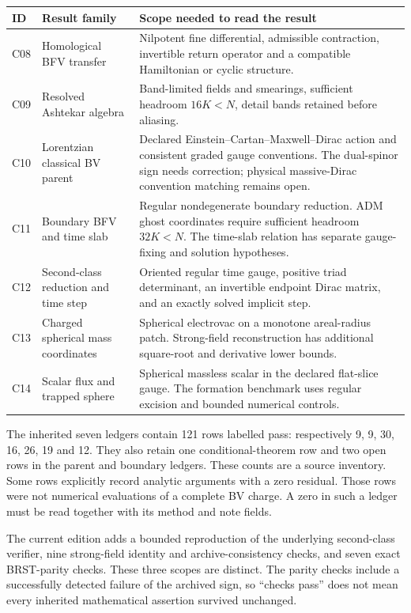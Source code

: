 \begin{longtable}{@{}L{.07\textwidth}L{.38\textwidth}L{.45\textwidth}@{}}
\toprule
ID & Result family & Scope needed to read the result\\
\midrule
\endhead
C08 & Homological BFV transfer & Nilpotent fine differential, admissible contraction, invertible return operator and a compatible Hamiltonian or cyclic structure.\\
C09 & Resolved Ashtekar algebra & Band-limited fields and smearings, sufficient headroom \(16K<N\), detail bands retained before aliasing.\\
C10 & Lorentzian classical BV parent & Declared Einstein--Cartan--Maxwell--Dirac action and consistent graded gauge conventions. The dual-spinor sign needs correction; physical massive-Dirac convention matching remains open.\\
C11 & Boundary BFV and time slab & Regular nondegenerate boundary reduction. ADM ghost coordinates require sufficient headroom \(32K<N\). The time-slab relation has separate gauge-fixing and solution hypotheses.\\
C12 & Second-class reduction and time step & Oriented regular time gauge, positive triad determinant, an invertible endpoint Dirac matrix, and an exactly solved implicit step.\\
C13 & Charged spherical mass coordinates & Spherical electrovac on a monotone areal-radius patch. Strong-field reconstruction has additional square-root and derivative lower bounds.\\
C14 & Scalar flux and trapped sphere & Spherical massless scalar in the declared flat-slice gauge. The formation benchmark uses regular excision and bounded numerical controls.\\
\bottomrule
\end{longtable}

The inherited seven ledgers contain 121 rows labelled pass: respectively 9, 9, 30, 16, 26, 19 and 12. They also retain one conditional-theorem row and two open rows in the parent and boundary ledgers. These counts are a source inventory. Some rows explicitly record analytic arguments with a zero residual. Those rows were not numerical evaluations of a complete BV charge. A zero in such a ledger must be read together with its method and note fields.

The current edition adds a bounded reproduction of the underlying second-class verifier, nine strong-field identity and archive-consistency checks, and seven exact BRST-parity checks. These three scopes are distinct. The parity checks include a successfully detected failure of the archived sign, so ``checks pass'' does not mean every inherited mathematical assertion survived unchanged.


